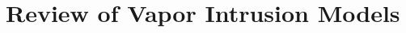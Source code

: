 \documentclass[../thesis.tex]{subfiles}
\begin{document}
\chapter{Review of Vapor Intrusion Models}


\end{document}
